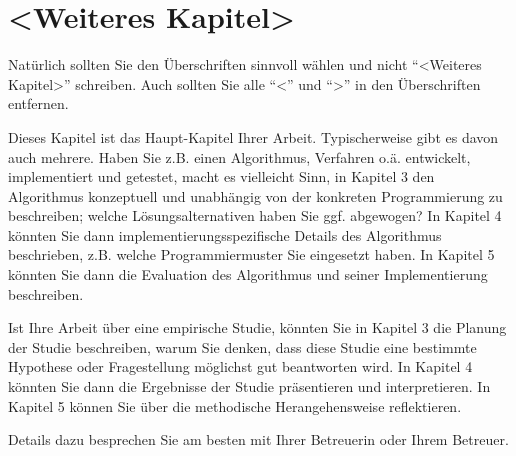 \chapter{<Weiteres Kapitel>}
\label{chap:weiteres-kapitel}


Natürlich sollten Sie den Überschriften sinnvoll wählen und nicht "`<Weiteres Kapitel>"' schreiben. Auch sollten Sie alle "`<"' und "`>"' in den Überschriften entfernen.

Dieses Kapitel ist das Haupt-Kapitel Ihrer Arbeit. Typischerweise gibt es davon auch mehrere. Haben Sie z.B. einen Algorithmus, Verfahren o.ä. entwickelt, implementiert und getestet, macht es vielleicht Sinn, in  Kapitel 3 den Algorithmus konzeptuell und unabhängig von der konkreten Programmierung zu beschreiben; welche Lösungsalternativen haben Sie ggf. abgewogen? In Kapitel 4 könnten Sie dann implementierungsspezifische Details des Algorithmus beschrieben, z.B. welche Programmiermuster Sie eingesetzt haben. In Kapitel 5 könnten Sie dann die Evaluation des Algorithmus und seiner Implementierung beschreiben.

Ist Ihre Arbeit über eine empirische Studie, könnten Sie in Kapitel 3 die Planung der Studie beschreiben, warum Sie denken, dass diese Studie eine bestimmte Hypothese oder Fragestellung möglichst gut beantworten wird. In Kapitel 4 könnten Sie dann die Ergebnisse der Studie präsentieren und interpretieren. In Kapitel 5 können Sie über die methodische Herangehensweise reflektieren.

Details dazu besprechen Sie am besten mit Ihrer Betreuerin oder Ihrem Betreuer.